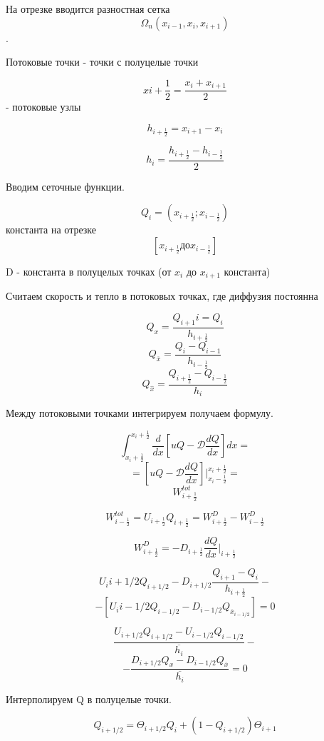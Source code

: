 \documentclass[12pt, a4paper]{article}
\begin{document}
На отрезке вводится разностная сетка \[ \Omega_n (x_{i-1}, x_{i}, x_{i+1})\].

Потоковые точки - точки с полуцелые точки

\[ x{i+\frac{1}{2}} = \frac{x_i + x_{i+1}}{2} \] - потоковые узлы

\[ h_{i+\frac{1}{2}} = x_{i+1} - x_{i} \]

\[ h_{i} = \frac{h_{i+\frac{1}{2}} - h_{i-\frac{1}{2}}}{2} \]

Вводим сеточные функции.

\[ Q_i = (x_{i+\frac{1}{2}}; x_{i-\frac{1}{2}}) \]
константа на отрезке
\[ [x_{i+\frac{1}{2}} \textrm{до} x_{i-\frac{1}{2}}] \]

D - константа в полуцелых точках (от $ x_i $ до  $ x_{i+1} $ константа)

Считаем скорость и тепло в потоковых точках, где диффузия постоянна

\[ Q_x = \frac{Q_{i+1}i = Q_i}{h_{i+\frac{1}{2}}} \]
\[ Q_{\overline{x}} = \frac{Q_{i} - Q_{i-1}}{h_{i-\frac{1}{2}}} \]
\[ Q_{\widehat{x}} = \frac{Q_{i+\frac{1}{2}} - Q_{i-\frac{1}{2}}}{h_{i}} \]

Между потоковыми точками интегрируем получаем формулу.

\[ \int_{x_{i}+\frac{1}{2}}^{x_{i}+\frac{1}{2}} \frac{d}{d x} [uQ - \mathcal{D}\frac{dQ}{dx}]dx = \]
\[ = [uQ - \mathcal{D}\frac{dQ}{dx}]|_{x_{i} - \frac{1}{2}}^{x_i + \frac{1}{2} } = \]
\[ W^{tot}_{i + \frac{1}{2}} \]

\[ W^{tot}_{i-\frac{1}{2}} = U_{i+\frac{1}{2}} Q_{i+\frac{1}{2}} = W^D_{i+\frac{1}{2}} - W^D_{i-\frac{1}{2}} \]

\[ W^D_{i+\frac{1}{2}} = - D_{i+\frac{1}{2}} \frac{dQ}{dx}|_{i+\frac{1}{2}} \]

\[ U_i{i+1/2} Q_{i+1/2} - D_{i+1/2}\frac{Q_{i+1} - Q_i}{h_{i+\frac{1}{2}}} -\]
\[ - [U_i{i-1/2} Q_{i-1/2} - D_{i-1/2} Q_{{\overline{x}}_{i-1/2}}]= 0 \]

\[ \frac{U_{i+1/2} Q_{i+1/2}  - U_{i-1/2} Q_{i-1/2}}{\overline{h_i}} -\]
\[-\frac{D_{i+1/2} Q_x - D_{i-1/2} Q_{\overline{x}}}{\overline{h_i}} = 0 \]

Интерполируем Q в полуцелые точки.

\[ Q_{i+1/2} = \Theta_{i+1/2} Q_i + (1-Q_{i+1/2}) \Theta_{i+1} \]
\end{document}
